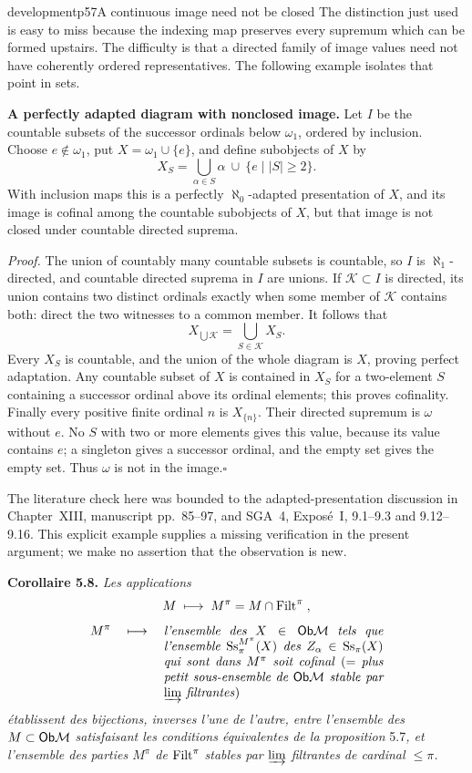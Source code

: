 \begin{dcomment}{development}{p57}{A continuous image need not be closed}
The distinction just used is easy to miss because the indexing map preserves every supremum which can be formed upstairs. The difficulty is that a directed family of image values need not have coherently ordered representatives. The following example isolates that point in sets.

\textbf{A perfectly adapted diagram with nonclosed image.}\ours
Let $I$ be the countable subsets of the successor ordinals below $\omega_1$, ordered by inclusion. Choose $e\notin\omega_1$, put $X=\omega_1\cup\{e\}$, and define subobjects of $X$ by
\[
 X_S=\bigcup_{\alpha\in S}\alpha
       \ \cup\ \{e\mid |S|\geq2\}.
\]
With inclusion maps this is a perfectly $\aleph_0$-adapted presentation of $X$, and its image is cofinal among the countable subobjects of $X$, but that image is not closed under countable directed suprema.

\emph{Proof.} The union of countably many countable subsets is countable, so $I$ is $\aleph_1$-directed, and countable directed suprema in $I$ are unions. If $\mathcal K\subset I$ is directed, its union contains two distinct ordinals exactly when some member of $\mathcal K$ contains both: direct the two witnesses to a common member. It follows that
\[
 X_{\bigcup\mathcal K}=\bigcup_{S\in\mathcal K}X_S.
\]
Every $X_S$ is countable, and the union of the whole diagram is $X$, proving perfect adaptation. Any countable subset of $X$ is contained in $X_S$ for a two-element $S$ containing a successor ordinal above its ordinal elements; this proves cofinality. Finally every positive finite ordinal $n$ is $X_{\{n\}}$. Their directed supremum is $\omega$ without $e$. No $S$ with two or more elements gives this value, because its value contains $e$; a singleton gives a successor ordinal, and the empty set gives the empty set. Thus $\omega$ is not in the image.\hfill$\square$

The literature check here was bounded to the adapted-presentation discussion in Chapter~XIII, manuscript pp.~85--97, and SGA~4, Expos\'e~I, 9.1--9.3 and 9.12--9.16. This explicit example supplies a missing verification in the present argument; we make no assertion that the observation is new.
\end{dcomment}


\textbf{Corollaire 5.8.} \textit{Les applications}
\[
M \;\longmapsto\; M^\pi = M \cap \mathrm{Filt}^\pi \;,
\]
\[
M^\pi \quad\longmapsto\quad \parbox[t]{0.5\textwidth}{\textit{l'ensemble des $X \in \Ob\M$ tels que l'ensemble $\Ss_\pi^{M^\pi}(X)$ des $Z_\alpha \in \Ss_\pi(X)$ qui sont dans $M^\pi$ soit cofinal} (= \textit{plus petit sous-ensemble de $\Ob\M$ stable par $\varinjlim$ filtrantes})}
\]
\textit{établissent des bijections, inverses l'une de l'autre, entre l'ensemble des $M \subset \mathsf{Ob}\mathcal{M}$ satisfaisant les conditions équivalentes de la proposition} 5.7\textit{, et l'ensemble des parties $M^\pi$ de} $\mathrm{Filt}^\pi$ \textit{stables par $\varinjlim$ filtrantes de cardinal $\leq \pi$.}

